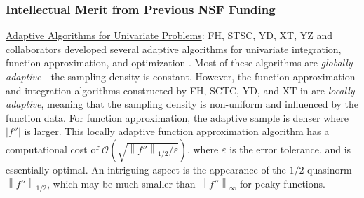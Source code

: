 \documentclass[11pt]{NSFamsart}
\newcommand{\Upara}[1]{\noindent\underline{#1}:\xspace}
\def\abs#1{\ensuremath{\left \lvert #1 \right \rvert}}
\newcommand{\norm}[2][{}]{\ensuremath{\left \lVert #2 \right \rVert}_{#1}}
\newcommand{\Order}{\mathcal{O}}
\begin{document}
\subsubsection{Intellectual Merit from Previous NSF Funding}
\label{previousmeritsubsec}
\phantom{a}

\Upara{Adaptive Algorithms for Univariate Problems}
FH, STSC, YD, XT, YZ and collaborators developed several adaptive algorithms for univariate integration, function approximation, and optimization \cite{ChoEtal17a,HicEtal14b,  Din15a, Ton14a, Zha18a}.  Most of these algorithms are \emph{globally adaptive}---the sampling density is constant. However, the function approximation and integration algorithms constructed by FH, SCTC, YD, and XT in \cite{ChoEtal17a} are \emph{locally adaptive}, meaning that the sampling density is non-uniform and influenced by the function data.  For function approximation, the adaptive sample is denser where $\abs{f''}$ is larger.  This locally adaptive function approximation algorithm has a computational cost of $\Order\left(\sqrt{\norm[1/2]{f''}/\varepsilon} \right)$, where $\varepsilon$ is the error tolerance, and is essentially optimal.  An intriguing aspect is the appearance of the $1/2$-quasinorm $\norm[1/2]{f''}$, which may be much smaller than 
$\norm[\infty]{f''}$ for peaky functions.
\end{document}
